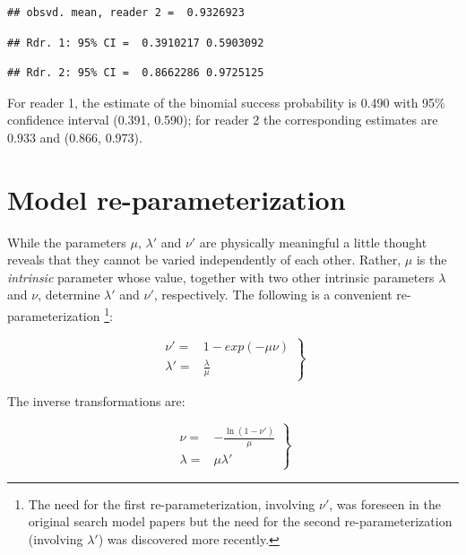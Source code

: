 \documentclass[
]{book}
\begin{document}
\begin{verbatim}
## obsvd. mean, reader 2 =  0.9326923
\end{verbatim}

\begin{verbatim}
## Rdr. 1: 95% CI =  0.3910217 0.5903092
\end{verbatim}

\begin{verbatim}
## Rdr. 2: 95% CI =  0.8662286 0.9725125
\end{verbatim}

For reader 1, the estimate of the binomial success probability is 0.490 with 95\% confidence interval (0.391, 0.590); for reader 2 the corresponding estimates are 0.933 and (0.866, 0.973).

\hypertarget{rsm-re-parameterization}{%
\section{Model re-parameterization}\label{rsm-re-parameterization}}

While the parameters \(\mu\), \(\lambda'\) and \(\nu'\) are physically meaningful a little thought reveals that they cannot be varied independently of each other. Rather, \(\mu\) is the \emph{intrinsic} parameter whose value, together with two other intrinsic parameters \(\lambda\) and \(\nu\), determine \(\lambda'\) and \(\nu'\), respectively. The following is a convenient re-parameterization \footnote{The need for the first re-parameterization, involving \(\nu'\), was foreseen in the original search model papers \citep{chakraborty2006search, chakraborty2006roc} but the need for the second re-parameterization (involving \(\lambda'\)) was discovered more recently.}:

\begin{equation}
\left. 
\begin{aligned}
\nu' =& 1 - exp\left ( - \mu \nu \right ) \\
\lambda' =& \frac{\lambda}{\mu}
\end{aligned}
\right \}
\label{eq:rsm-transform}
\end{equation}

The inverse transformations are:

\begin{equation}
\left. 
\begin{aligned}
\nu =& - \frac{\ln \left ( 1-\nu' \right )}{\mu}\\
\lambda =& \mu \lambda' 
\end{aligned}
\right \}
\label{eq:rsm-inv-transform}
\end{equation}
\end{document}
